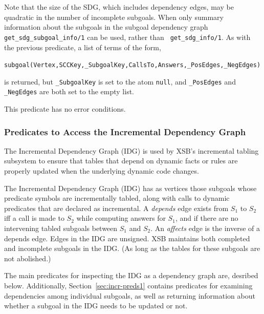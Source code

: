 \begin{description}
\begin{example}
\end{example}

%
Note that the size of the SDG, which includes dependency edges, may be
quadratic in the number of incomplete subgoals.  When only summary
information about the subgoals in the subgoal dependency graph {\tt
  get\_sdg\_subgoal\_info/1} can be used, rather than {\tt
  get\_sdg\_info/1}.  As with the previous predicate, a list of terms of the form, 
%

{\small
\noindent
{\tt subgoal(Vertex,SCCKey,\_SubgoalKey,CallsTo,Answers,\_PosEdges,\_NegEdges)} }
%

\noindent
is returned, but {\tt \_SubgoalKey} is set to the atom {\tt null}, and
{\tt \_PosEdges} and {\tt \_NegEdges} are both set to the empty list.

This predicate has no error conditions.

\end{description}

\subsubsection{Predicates to Access the Incremental Dependency Graph} \label{sec:idg-preds}

The Incremental Dependency Graph (IDG) is used by XSB's incremental
tabling subsystem to ensure that tables that depend on dynamic facts
or rules are properly updated when the underlying dynamic code
changes.

The Incremental Dependency Graph (IDG) has as vertices those subgoals
whose predicate symbols are incrementally tabled, along with calls to
dynamic predicates that are declared as incremental.  A {\em depends}
edge exists from $S_1$ to $S_2$ iff a call is made to $S_2$ while
computing answers for $S_1$, and if there are no intervening tabled
subgoals between $S_1$ and $S_2$.  An {\em affects} edge is the
inverse of a depends edge.  Edges in the IDG are unsigned.  XSB
maintains both completed and incomplete subgoals in the IDG. (As long
as the tables for these subgoals are not abolished.)

The main predicates for inspecting the IDG as a dependency graph are,
desribed below.  Additionally, Section~\ref{sec:incr-preds1} contains
predicates for examining dependencies among individual subgoals, as
well as returning information about whether a subgoal in the IDG needs
to be updated or not.

